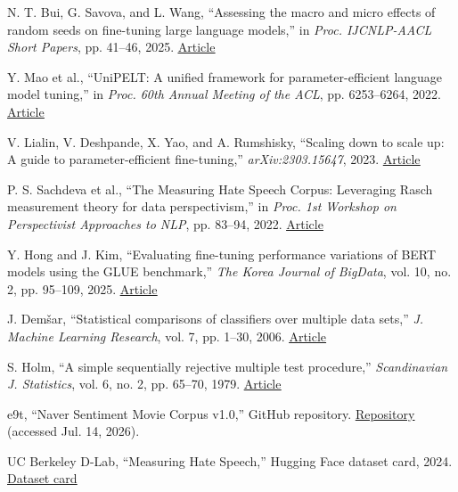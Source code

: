 \documentclass{SPC}
\begin{document}
\begin{reference}
 N. T. Bui, G. Savova, and L. Wang, ``Assessing the macro and micro effects of random seeds on fine-tuning large language models,'' in \textit{Proc. IJCNLP-AACL Short Papers}, pp. 41--46, 2025. \href{https://doi.org/10.18653/v1/2025.ijcnlp-short.3}{\underline{Article}}

 Y. Mao et al., ``UniPELT: A unified framework for parameter-efficient language model tuning,'' in \textit{Proc. 60th Annual Meeting of the ACL}, pp. 6253--6264, 2022. \href{https://doi.org/10.18653/v1/2022.acl-long.433}{\underline{Article}}

 V. Lialin, V. Deshpande, X. Yao, and A. Rumshisky, ``Scaling down to scale up: A guide to parameter-efficient fine-tuning,'' \textit{arXiv:2303.15647}, 2023. \href{https://arxiv.org/abs/2303.15647}{\underline{Article}}

 P. S. Sachdeva et al., ``The Measuring Hate Speech Corpus: Leveraging Rasch measurement theory for data perspectivism,'' in \textit{Proc. 1st Workshop on Perspectivist Approaches to NLP}, pp. 83--94, 2022. \href{https://aclanthology.org/2022.nlperspectives-1.11/}{\underline{Article}}

 Y. Hong and J. Kim, ``Evaluating fine-tuning performance variations of BERT models using the GLUE benchmark,'' \textit{The Korea Journal of BigData}, vol. 10, no. 2, pp. 95--109, 2025. \href{https://doi.org/10.36498/kbigdt.2025.10.2.95}{\underline{Article}}

 J. Dem\v{s}ar, ``Statistical comparisons of classifiers over multiple data sets,'' \textit{J. Machine Learning Research}, vol. 7, pp. 1--30, 2006. \href{https://jmlr.org/papers/v7/demsar06a.html}{\underline{Article}}

 S. Holm, ``A simple sequentially rejective multiple test procedure,'' \textit{Scandinavian J. Statistics}, vol. 6, no. 2, pp. 65--70, 1979. \href{https://www.jstor.org/stable/4615733}{\underline{Article}}

 e9t, ``Naver Sentiment Movie Corpus v1.0,'' GitHub repository. \href{https://github.com/e9t/nsmc}{\underline{Repository}} (accessed Jul. 14, 2026).

 UC Berkeley D-Lab, ``Measuring Hate Speech,'' Hugging Face dataset card, 2024. \href{https://doi.org/10.57967/hf/2710}{\underline{Dataset card}}

\end{reference}


\end{document}

